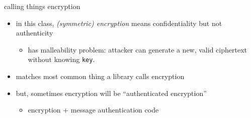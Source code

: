 \begin{frame}{calling things encryption}
    \begin{itemize}
    \item in this class, \textit{(symmetric) encryption} means confidentiality but not authenticity
        \begin{itemize}
        \item has malleability problem: attacker can generate a new, valid ciphertext without knowing \texttt{key}.
        \end{itemize}
    \item matches most common thing a library calls encryption
    \vspace{.5cm}
    \item but, sometimes encryption will be ``authenticated encryption''
        \begin{itemize}
        \item encryption + message authentication code
        \end{itemize}
    \end{itemize}
\end{frame}
